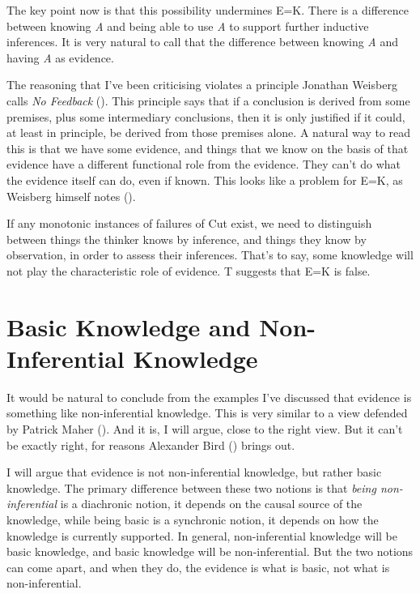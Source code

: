 \documentclass[
  10pt,
  letterpaper,
  twoside]{scrbook}
\begin{document}
The key point now is that this possibility undermines E=K. There is a
difference between knowing \emph{A} and being able to use \emph{A} to
support further inductive inferences. It is very natural to call that
the difference between knowing \emph{A} and having \emph{A} as evidence.

The reasoning that I've been criticising violates a principle Jonathan
Weisberg calls \emph{No Feedback} (). This principle says that if a conclusion is derived from
some premises, plus some intermediary conclusions, then it is only
justified if it could, at least in principle, be derived from those
premises alone. A natural way to read this is that we have some
evidence, and things that we know on the basis of that evidence have a
different functional role from the evidence. They can't do what the
evidence itself can do, even if known. This looks like a problem for
E=K, as Weisberg himself notes ().

If any monotonic instances of failures of Cut exist, we need to
distinguish between things the thinker knows by inference, and things
they know by observation, in order to assess their inferences. That's to
say, some knowledge will not play the characteristic role of evidence. T
suggests that E=K is false.

\section{Basic Knowledge and Non-Inferential Knowledge}\label{sec-basic}

It would be natural to conclude from the examples I've discussed that
evidence is something like non-inferential knowledge. This is very
similar to a view defended by Patrick Maher
(). And it is, I will argue, close to the
right view. But it can't be exactly right, for reasons Alexander Bird
() brings out.

I will argue that evidence is not non-inferential knowledge, but rather
basic knowledge. The primary difference between these two notions is
that \emph{being non-inferential} is a diachronic notion, it depends on
the causal source of the knowledge, while being basic is a synchronic
notion, it depends on how the knowledge is currently supported. In
general, non-inferential knowledge will be basic knowledge, and basic
knowledge will be non-inferential. But the two notions can come apart,
and when they do, the evidence is what is basic, not what is
non-inferential.
\end{document}
